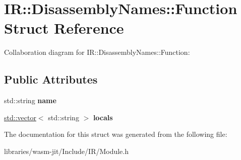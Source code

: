 \hypertarget{struct_i_r_1_1_disassembly_names_1_1_function}{}\section{IR\+:\+:Disassembly\+Names\+:\+:Function Struct Reference}
\label{struct_i_r_1_1_disassembly_names_1_1_function}


Collaboration diagram for IR\+:\+:Disassembly\+Names\+:\+:Function\+:
\subsection*{Public Attributes}
\begin{DoxyCompactItemize}
\item 
\mbox{\label{struct_i_r_1_1_disassembly_names_1_1_function_a4604936b1847882abaa9627fb6ff8621}} 
std\+::string {\bfseries name}
\item 
\mbox{\label{struct_i_r_1_1_disassembly_names_1_1_function_afc977d5b7c5be316e5590db5d7387f4c}} 
\mbox{\hyperlink{classstd_1_1vector}{std\+::vector}}$<$ std\+::string $>$ {\bfseries locals}
\end{DoxyCompactItemize}


The documentation for this struct was generated from the following file\+:\begin{DoxyCompactItemize}
\item 
libraries/wasm-\/jit/\+Include/\+I\+R/Module.\+h\end{DoxyCompactItemize}
